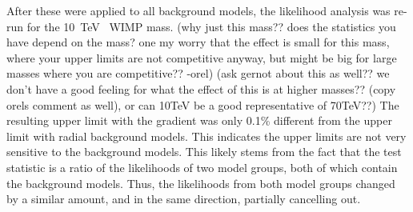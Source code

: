   After these were applied to all background models, the likelihood analysis was re-run for the \SI{10}{\TeV{}} WIMP mass.
  {\color{red}(why just this mass?? does the statistics you have depend on the mass? one my worry that the effect is small for this mass, where your upper limits are not competitive anyway, but might be big for large masses where you are competitive?? -orel)}
  {\color{red}(ask gernot about this as well?? we don't have a good feeling for what the effect of this is at higher masses?? (copy orels comment as well), or can 10TeV be a good representative of 70TeV??)}
  The resulting upper limit with the gradient was only 0.1\% different from the upper limit with radial background models.
  This indicates the upper limits are not very sensitive to the background models.
  This likely stems from the fact that the test statistic is a ratio of the likelihoods of two model groups, both of which contain the background models.
  Thus, the likelihoods from both model groups changed by a similar amount, and in the same direction, partially cancelling out.




